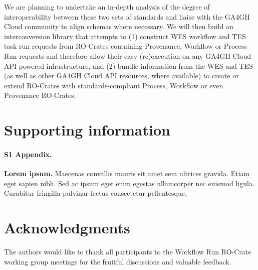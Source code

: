 \documentclass[10pt,letterpaper]{article}
\begin{document}
We are planning to undertake an in-depth analysis of the degree of interoperability between these two sets of standards and liaise with the GA4GH Cloud community to align schemas where necessary.
We will then build an interconversion library that attempts to (1) construct WES workflow and TES task run requests from RO-Crates containing Provenance, Workflow or Process Run requests and therefore allow their easy (re)execution on any GA4GH Cloud API-powered infrastructure, and (2) bundle information from the WES and TES (as well as other GA4GH Cloud API resources, where available) to create or extend RO-Crates with standards-compliant Process, Workflow or even Provenance RO-Crates.





\section*{Supporting information}



\paragraph*{S1 Appendix.}
\label{S1_Appendix}
{\bf Lorem ipsum.} Maecenas convallis mauris sit amet sem ultrices gravida. Etiam eget sapien nibh. Sed ac ipsum eget enim egestas ullamcorper nec euismod ligula. Curabitur fringilla pulvinar lectus consectetur pellentesque.


\section*{Acknowledgments}

The authors would like to thank all participants to the Workflow Run
RO-Crate working group meetings for the fruitful discussions and
valuable feedback.
\end{document}
